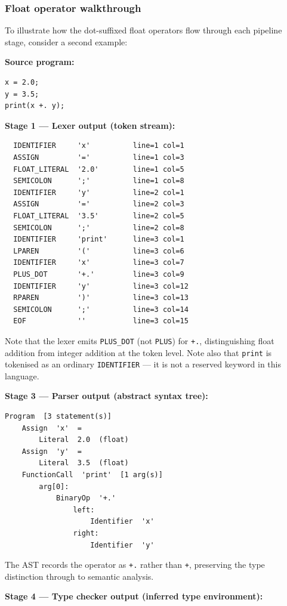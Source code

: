 \subsubsection*{Float operator walkthrough}

To illustrate how the dot-suffixed float operators flow through each pipeline
stage, consider a second example:

\textbf{Source program:}
\begin{lstlisting}
x = 2.0;
y = 3.5;
print(x +. y);
\end{lstlisting}

\textbf{Stage 1 --- Lexer output (token stream):}
\begin{lstlisting}
  IDENTIFIER     'x'          line=1 col=1
  ASSIGN         '='          line=1 col=3
  FLOAT_LITERAL  '2.0'        line=1 col=5
  SEMICOLON      ';'          line=1 col=8
  IDENTIFIER     'y'          line=2 col=1
  ASSIGN         '='          line=2 col=3
  FLOAT_LITERAL  '3.5'        line=2 col=5
  SEMICOLON      ';'          line=2 col=8
  IDENTIFIER     'print'      line=3 col=1
  LPAREN         '('          line=3 col=6
  IDENTIFIER     'x'          line=3 col=7
  PLUS_DOT       '+.'         line=3 col=9
  IDENTIFIER     'y'          line=3 col=12
  RPAREN         ')'          line=3 col=13
  SEMICOLON      ';'          line=3 col=14
  EOF            ''           line=3 col=15
\end{lstlisting}

\noindent Note that the lexer emits \texttt{PLUS\_DOT} (not \texttt{PLUS}) for
\texttt{+.}, distinguishing float addition from integer addition at the token
level. Note also that \texttt{print} is tokenised as an ordinary
\texttt{IDENTIFIER} --- it is not a reserved keyword in this language.

\textbf{Stage 3 --- Parser output (abstract syntax tree):}
\begin{lstlisting}
Program  [3 statement(s)]
    Assign  'x'  =
        Literal  2.0  (float)
    Assign  'y'  =
        Literal  3.5  (float)
    FunctionCall  'print'  [1 arg(s)]
        arg[0]:
            BinaryOp  '+.'
                left:
                    Identifier  'x'
                right:
                    Identifier  'y'
\end{lstlisting}

\noindent The AST records the operator as \texttt{+.} rather than \texttt{+},
preserving the type distinction through to semantic analysis.

\textbf{Stage 4 --- Type checker output (inferred type environment):}

